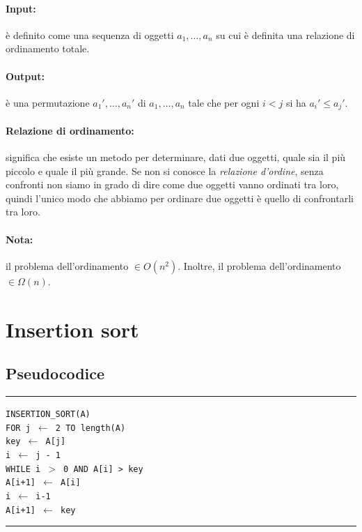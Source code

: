 \documentclass[a4paper,12pt,twoside]{report}
\newcommand\pseudo[1]{\setlength\parindent{0pt}\texttt{#1}\setlength\parindent{24pt} \\}
\newcommand\hlin{\noindent\rule[0.5ex]{\linewidth}{1pt}}
\newcommand\take[2]{#1 $\leftarrow$ #2}
\begin{document}
\paragraph{Input:} \`{e} definito come una sequenza di oggetti $a_1, \dots, a_n$ su cui \`{e} definita una relazione di ordinamento totale.
\paragraph{Output:} \`{e} una permutazione $a_{1}', \dots, a_{n}'$ di $a_1, \dots, a_n$ tale che per ogni $i < j$ si ha $a_{i}' \le a_{j}'$.
\paragraph{Relazione di ordinamento:} significa che esiste un metodo per determinare, dati due oggetti, quale sia il pi\`{u} piccolo e quale il pi\`{u} grande. Se non si conosce la \emph{relazione d'ordine}, senza confronti non siamo in grado di dire come due oggetti vanno ordinati tra loro, quindi l'unico modo che abbiamo per ordinare due oggetti \`{e} quello di confrontarli tra loro. 

\paragraph{Nota:} il problema dell'ordinamento $\in O(n^2)$. Inoltre, il problema dell'ordinamento $\in \Omega(n)$.

\newpage
\section{Insertion sort}
\subsection{Pseudocodice}

\hlin

\pseudo{INSERTION\_SORT(A)}
\texttt{\indent FOR j $\leftarrow$ 2 TO length(A) \\
\indent\indent key $\leftarrow$ A[j] \\
\indent\indent i $\leftarrow$ j - 1 \\
\indent\indent WHILE i $>$ 0 AND A[i] > key \\
\indent\indent\indent A[i+1] $\leftarrow$ A[i] \\
\indent\indent\indent \take{i}{i-1} \\
\indent\indent A[i+1] $\leftarrow$ key \\
}
\hlin
\end{document}
